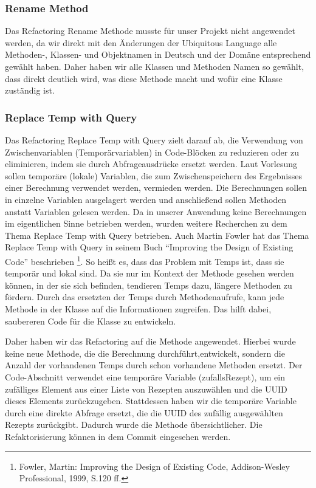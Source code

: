 \subsubsection{Rename Method}
Das Refactoring Rename Methode musste für unser Projekt nicht angewendet werden, da wir direkt mit den Änderungen der Ubiquitous Language alle Methoden-, Klassen- und Objektnamen in Deutsch und der Domäne entsprechend gewählt haben. Daher haben wir alle Klassen und Methoden Namen so gewählt, dass direkt deutlich wird, was diese Methode macht und wofür eine Klasse zuständig ist.

\subsubsection{Replace Temp with Query}
Das Refactoring Replace Temp with Query zielt darauf ab, die Verwendung von Zwischenvariablen (Temporärvariablen) in Code-Blöcken zu reduzieren oder zu eliminieren, indem sie durch Abfrageausdrücke ersetzt werden. 
Laut Vorlesung sollen temporäre (lokale) Variablen, die zum Zwischenspeichern des Ergebnisses einer Berechnung verwendet werden, vermieden werden. Die Berechnungen sollen in einzelne Variablen ausgelagert werden und anschließend sollen Methoden anstatt Variablen gelesen werden. 
Da in unserer Anwendung keine Berechnungen im eigentlichen Sinne betrieben werden, wurden weitere Recherchen zu dem Thema Replace Temp with Query betrieben. Auch Martin Fowler hat das Thema Replace Temp with Query in seinem Buch \enquote{Improving the Design of Existing Code} beschrieben \footnote[1]{Fowler, Martin: Improving the Design of Existing Code, Addison-Wesley Professional, 1999, S.120 ff.}. So heißt es, dass das Problem mit Temps ist, dass sie temporär und lokal sind. Da sie nur im Kontext der Methode gesehen werden können, in der sie sich befinden, tendieren Temps dazu, längere Methoden zu fördern. Durch das ersetzten der Temps durch Methodenaufrufe, kann jede Methode in der Klasse auf die Informationen zugreifen. Das hilft dabei, saubereren Code für die Klasse zu entwickeln.

Daher haben wir das Refactoring auf die Methode  angewendet. Hierbei wurde keine neue Methode, die die Berechnung durchführt,entwickelt, sondern die Anzahl der vorhandenen Temps durch schon vorhandene Methoden ersetzt. Der Code-Abschnitt verwendet eine temporäre Variable (zufallsRezept), um ein zufälliges Element aus einer Liste von Rezepten auszuwählen und die UUID dieses Elements zurückzugeben. Stattdessen haben wir die temporäre Variable durch eine direkte Abfrage ersetzt, die die UUID des zufällig ausgewählten Rezepts zurückgibt. Dadurch wurde die Methode übersichtlicher. Die Refaktorisierung können in dem Commit \href{https://github.com/MichaelaHaag/RezeptApp/commit/4e0bedc859ba644d448fe4c89a3a6e1320519593}{} eingesehen werden. 

